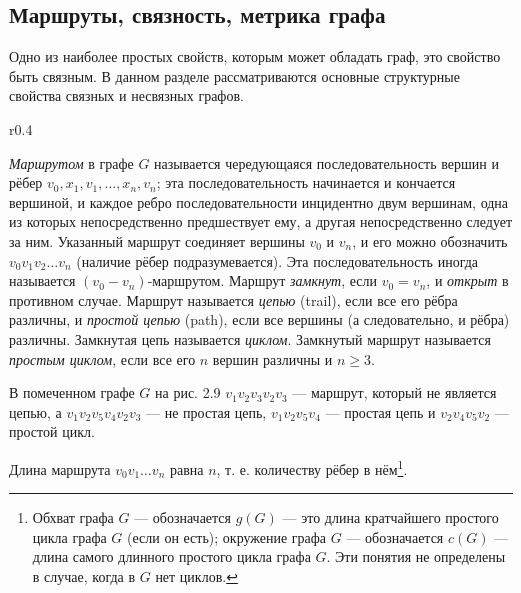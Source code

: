 \subsection{Маршруты, связность, метрика графа}

Одно из наиболее простых свойств, которым может обладать граф, это свойство быть связным. В данном разделе рассматриваются основные структурные свойства связных и несвязных графов.
\begin{wrapfigure}{r}{0.4\textwidth}
	\centering
\end{wrapfigure}
\textit{Маршрутом} в графе $G$ называется чередующаяся последовательность вершин и рёбер $v_0, x_1, v_1, \ldots, x_n, v_n$; эта последовательность начинается и кончается вершиной, и каждое ребро последовательности инцидентно двум вершинам, одна из которых непосредственно предшествует ему, а другая непосредственно следует за ним. Указанный маршрут соединяет вершины $v_0$ и $v_n$, и его можно обозначить $v_0 v_1 v_2 \ldots v_n$ (наличие рёбер подразумевается). Эта последовательность иногда называется $(v_0-v_n)$-маршрутом. Маршрут \textit{замкнут}, если $v_0 = v_n$, и \textit{открыт} в противном случае. Маршрут называется \textit{цепью} (trail), если все его рёбра различны, и \textit{простой цепью} (path), если все вершины (а следовательно, и рёбра) различны. Замкнутая цепь называется \textit{циклом}. Замкнутый маршрут называется \textit{простым циклом}, если все его $n$ вершин различны и $n \geq 3$.

В помеченном графе $G$ на рис. 2.9 $v_1 v_2 v_3 v_2 v_3$ — маршрут, который не является цепью, а $v_1 v_2 v_5 v_4 v_2 v_3$ — не простая цепь, $v_1 v_2 v_5 v_4$ — простая цепь и $v_2 v_4 v_5 v_2$ — простой цикл.

Длина маршрута $v_0 v_1 \ldots v_n$ равна $n$, т. е. количеству рёбер в нём\footnote{Обхват графа $G$ — обозначается $g(G)$ — это длина кратчайшего простого цикла графа $G$ (если он есть); окружение графа $G$ — обозначается $c(G)$ — длина самого длинного простого цикла графа $G$. Эти понятия не определены в случае, когда в $G$ нет циклов.}.

